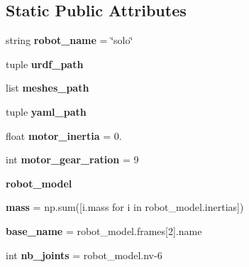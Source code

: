\subsection*{Static Public Attributes}
\begin{DoxyCompactItemize}
\item 
string {\bfseries robot\+\_\+name} = \char`\"{}solo\char`\"{}\hypertarget{classrobot__properties__solo_1_1config_1_1SoloConfig_a4e8858bf41253f84618b56cb4078a895}{}\label{classrobot__properties__solo_1_1config_1_1SoloConfig_a4e8858bf41253f84618b56cb4078a895}

\item 
tuple {\bfseries urdf\+\_\+path}
\item 
list {\bfseries meshes\+\_\+path}
\item 
tuple {\bfseries yaml\+\_\+path}
\item 
float {\bfseries motor\+\_\+inertia} = 0.\hypertarget{classrobot__properties__solo_1_1config_1_1SoloConfig_a12d720f23faf864ef7647c757af1b218}{}\label{classrobot__properties__solo_1_1config_1_1SoloConfig_a12d720f23faf864ef7647c757af1b218}

\item 
int {\bfseries motor\+\_\+gear\+\_\+ration} = 9\hypertarget{classrobot__properties__solo_1_1config_1_1SoloConfig_a559ced3a5570ce1276577ea5c3ab8602}{}\label{classrobot__properties__solo_1_1config_1_1SoloConfig_a559ced3a5570ce1276577ea5c3ab8602}

\item 
{\bfseries robot\+\_\+model}
\item 
{\bfseries mass} = np.\+sum(\mbox{[}i.\+mass for i in robot\+\_\+model.\+inertias\mbox{]})\hypertarget{classrobot__properties__solo_1_1config_1_1SoloConfig_aa37d5b10d35ab3b579fd62b4e1ad572e}{}\label{classrobot__properties__solo_1_1config_1_1SoloConfig_aa37d5b10d35ab3b579fd62b4e1ad572e}

\item 
{\bfseries base\+\_\+name} = robot\+\_\+model.\+frames\mbox{[}2\mbox{]}.name\hypertarget{classrobot__properties__solo_1_1config_1_1SoloConfig_a0b4136fce9ca843680096545d6dc34a8}{}\label{classrobot__properties__solo_1_1config_1_1SoloConfig_a0b4136fce9ca843680096545d6dc34a8}

\item 
int {\bfseries nb\+\_\+joints} = robot\+\_\+model.\+nv-\/6\hypertarget{classrobot__properties__solo_1_1config_1_1SoloConfig_af689510a467b1a99d82d484fdfee0e36}{}\label{classrobot__properties__solo_1_1config_1_1SoloConfig_af689510a467b1a99d82d484fdfee0e36}


\end{DoxyCompactItemize}
